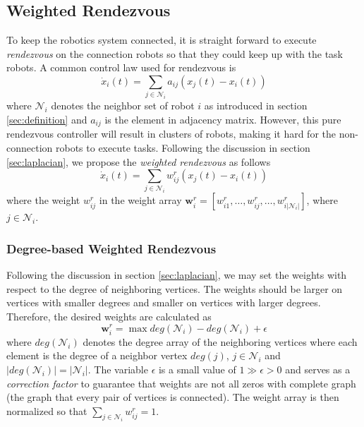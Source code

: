 \documentclass[../main.tex]{subfiles}
\begin{document}
\subsection{Weighted Rendezvous}
To keep the robotics system connected, it is straight forward to execute \textit{rendezvous} on the connection robots so that they could keep up with the task robots. A common control law used for rendezvous \cite{olfati2007consensus} is
\begin{equation} 
\dot x_i(t) = \sum_{j \in \mathcal{N}_i} a_{ij}(x_j(t) - x_i(t))
\end{equation}
where $\mathcal{N}_i$ denotes the neighbor set of robot $i$ as introduced in section \ref{sec:definition} and $a_{ij}$ is the element in adjacency matrix. However, this pure rendezvous controller will result in clusters of robots, making it hard for the non-connection robots to execute tasks. Following the discussion in section \ref{sec:laplacian}, we propose the \textit{weighted rendezvous} as follows
\begin{equation}\label{eq:weighted_rend} 
\dot x_i(t) = \sum_{j \in \mathcal{N}_i} w_{ij}^r(x_j(t) - x_i(t))
\end{equation}
where the weight $w_{ij}^r$ in the weight array $\mathbf{w}_i^r = \left[w_{i1}^r, \ldots, w_{ij}^r, \ldots, w_{i|\mathcal{N}_i|}^r\right]$, where $j \in \mathcal{N}_i$.

\subsubsection{Degree-based Weighted Rendezvous} \label{sec:degree_rend}
Following the discussion in section \ref{sec:laplacian}, we may set the weights with respect to the degree of neighboring vertices. The weights should be larger on vertices with smaller degrees and smaller on vertices with larger degrees. Therefore, the desired weights are calculated as 
\begin{equation}  \label{eq:degree_weight}
\mathbf{w}_i^r = \max deg(\mathcal{N}_i) - deg(\mathcal{N}_i) + \epsilon
\end{equation}
where $deg(\mathcal{N}_i)$ denotes the degree array of the neighboring vertices where each element is the degree of a neighbor vertex $deg(j)$, $j \in \mathcal{N}_i$ and $|deg(\mathcal{N}_i)| = |\mathcal{N}_i|$. The variable $\epsilon$ is a small value of $1 \gg \epsilon > 0$ and serves as a \textit{correction factor} to guarantee that weights are not all zeros with complete graph (the graph that every pair of vertices is connected). The weight array is then normalized so that $\sum_{j \in \mathcal{N}_i}w_{ij}^r = 1$.
\end{document}
